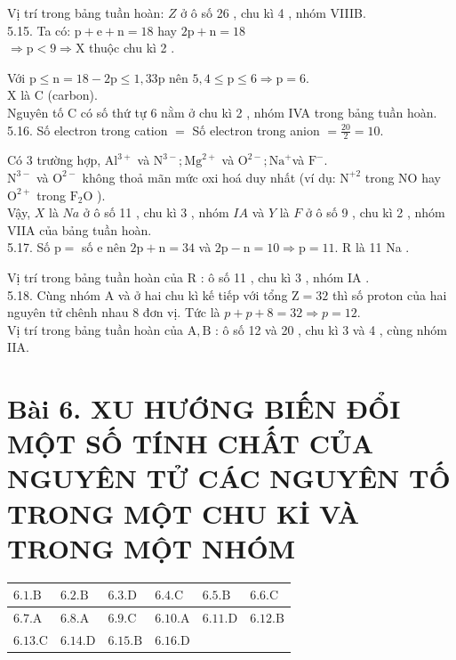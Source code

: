 \documentclass[10pt]{article}
\begin{document}
Vị trí trong bảng tuần hoàn: $Z$ ở ô số 26 , chu kì 4 , nhóm VIIIB.\\
5.15. Ta có: $\mathrm{p}+\mathrm{e}+\mathrm{n}=18$ hay $2 \mathrm{p}+\mathrm{n}=18$\\
$\Rightarrow \mathrm{p}<9 \Rightarrow \mathrm{X}$ thuộc chu kì 2 .

Với $\mathrm{p} \leq \mathrm{n}=18-2 \mathrm{p} \leq 1,33 \mathrm{p}$ nên $5,4 \leq \mathrm{p} \leq 6 \Rightarrow \mathrm{p}=6$.\\
X là C (carbon).\\
Nguyên tố C có số thứ tự 6 nằm ở chu kì 2 , nhóm IVA trong bảng tuần hoàn.\\
5.16. Số electron trong cation $=$ Số electron trong anion $=\frac{20}{2}=10$.

Có 3 trường hợp, $\mathrm{Al}^{3+}$ và $\mathrm{N}^{3-} ; \mathrm{Mg}^{2+}$ và $\mathrm{O}^{2-} ; \mathrm{Na}^{+}$và $\mathrm{F}^{-}$.\\
$\mathrm{N}^{3-}$ và $\mathrm{O}^{2-}$ không thoả mãn mức oxi hoá duy nhất (ví dụ: $\mathrm{N}^{+2}$ trong NO hay $\mathrm{O}^{2+}$ trong $\mathrm{F}_{2} \mathrm{O}$ ).\\
Vậy, $X$ là $N a$ ở ô số 11 , chu kì 3 , nhóm $I A$ và $Y$ là $F$ ở ô số 9 , chu kì 2 , nhóm VIIA của bảng tuần hoàn.\\
5.17. Số $\mathrm{p}=$ số e nên $2 \mathrm{p}+\mathrm{n}=34$ và $2 \mathrm{p}-\mathrm{n}=10 \Rightarrow \mathrm{p}=11$. R là 11 Na .

Vị trí trong bảng tuần hoàn của R : ô số 11 , chu kì 3 , nhóm IA .\\
5.18. Cùng nhóm A và ở hai chu kì kế tiếp với tổng $\mathrm{Z}=32$ thì số proton của hai nguyên tử chênh nhau 8 đơn vị. Tức là $p+p+8=32 \Rightarrow p=12$.\\
Vị trí trong bảng tuần hoàn của $\mathrm{A}, \mathrm{B}$ : ô số 12 và 20 , chu kì 3 và 4 , cùng nhóm IIA.

\section*{Bài 6. XU HƯỚNG BIẾN ĐỔI MỘT SỐ TÍNH CHẤT CỦA NGUYÊN TỬ CÁC NGUYÊN TỐ TRONG MỘT CHU Kİ VÀ TRONG MỘT NHÓM}
\begin{center}
\begin{tabular}{|l|l|l|l|l|l|}
\hline
$6.1 . \mathrm{B}$ & $6.2 . \mathrm{B}$ & $6.3 . \mathrm{D}$ & $6.4 . \mathrm{C}$ & $6.5 . \mathrm{B}$ & $6.6 . \mathrm{C}$ \\
\hline
$6.7 . \mathrm{A}$ & $6.8 . \mathrm{A}$ & $6.9 . \mathrm{C}$ & $6.10 . \mathrm{A}$ & $6.11 . \mathrm{D}$ & $6.12 . \mathrm{B}$ \\
\hline
$6.13 . \mathrm{C}$ & $6.14 . \mathrm{D}$ & $6.15 . \mathrm{B}$ & $6.16 . \mathrm{D}$ &  &  \\
\hline
\end{tabular}
\end{center}
\end{document}
